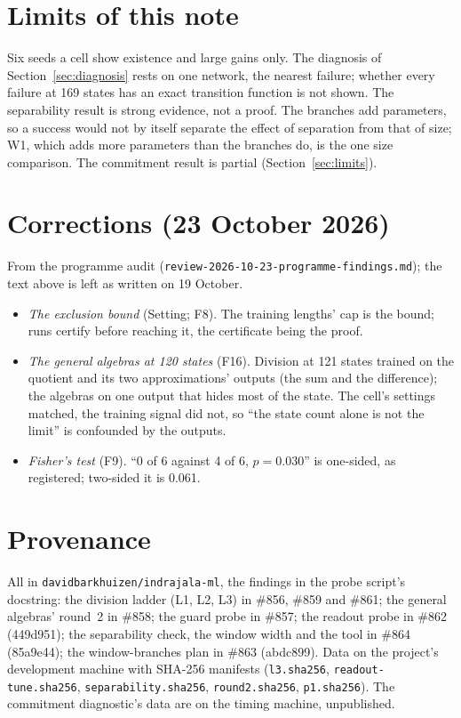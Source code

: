 \documentclass[11pt]{article}
\begin{document}
\section{Limits of this note}

Six seeds a cell show existence and large gains only. The diagnosis of Section~\ref{sec:diagnosis}
rests on one network, the nearest failure; whether every failure at 169 states has an exact
transition function is not shown. The separability result is strong evidence, not a proof. The
branches add parameters, so a success would not by itself separate the effect of separation from
that of size; W1, which adds more parameters than the branches do, is the one size comparison.
The commitment result is partial (Section~\ref{sec:limits}).

\section{Corrections (23 October 2026)}
\label{sec:corrections}

From the programme audit (\texttt{review-2026-10-23-programme-findings.md}); the text above is left
as written on 19 October.
\begin{itemize}
  \item \emph{The exclusion bound} (Setting; F8). The training lengths' cap is the bound; runs
  certify before reaching it, the certificate being the proof.
  \item \emph{The general algebras at 120 states} (F16). Division at 121 states trained on the
  quotient and its two approximations' outputs (the sum and the difference); the algebras on one
  output that hides most of the state. The cell's settings matched, the training signal did not, so
  ``the state count alone is not the limit'' is confounded by the outputs.
  \item \emph{Fisher's test} (F9). ``0 of 6 against 4 of 6, $p = 0.030$'' is one-sided, as
  registered; two-sided it is 0.061.
\end{itemize}

\section{Provenance}
\label{sec:provenance}

All in \texttt{davidbarkhuizen/indrajala-ml}, the findings in the probe script's docstring: the
division ladder (L1, L2, L3) in \#856, \#859 and \#861; the general algebras' round~2 in \#858; the
guard probe in \#857; the readout probe in \#862 (449d951); the separability check, the window
width and the tool in \#864 (85a9e44); the window-branches plan in \#863 (abdc899). Data on the
project's development machine with SHA-256 manifests (\texttt{l3.sha256},
\texttt{readout-tune.sha256}, \texttt{separability.sha256}, \texttt{round2.sha256},
\texttt{p1.sha256}). The commitment diagnostic's data are on the timing machine, unpublished.
\end{document}
